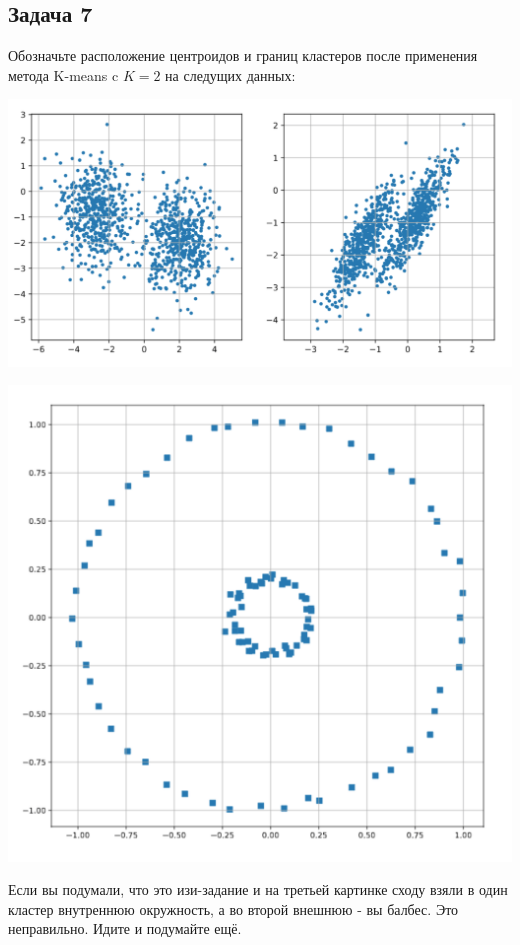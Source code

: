 \documentclass[12pt, a4paper, oneside]{article}
\begin{document}
\subsection*{Задача 7} 

Обозначьте расположение центроидов и границ кластеров после применения метода K-means c $K=2$ на следущих данных: 

\begin{minipage}[t]{0.66\textwidth}
	\begin{center}
		\includegraphics[scale=0.15]{clouds.png}
	\end{center}
\end{minipage}
\begin{minipage}[t]{0.33\textwidth}
	\begin{center}
		\includegraphics[scale=0.13]{circles.png}
	\end{center}
\end{minipage}

Если вы подумали, что это изи-задание и на третьей картинке сходу взяли в один кластер внутреннюю окружность, а во второй внешнюю - вы балбес. Это неправильно. Идите и подумайте ещё.
\end{document}
